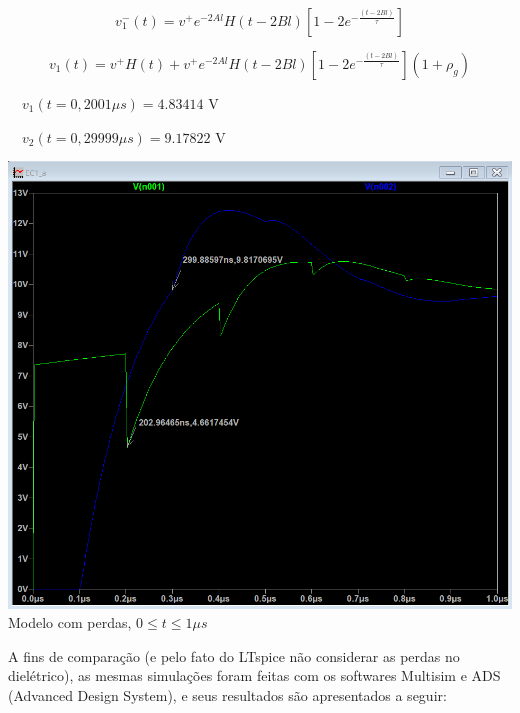 \documentclass[12pt,a4paper]{article}
\begin{document}
$$v_1^-(t) = v^+ e^{-2Al} H(t-2Bl)\left[ 1 - 2e^{-\frac{(t-2Bl)}{\tau}} \right]$$

$$v_1(t) = v^+ H(t) + v^+ e^{-2Al} H(t-2Bl)\left[ 1 - 2e^{-\frac{(t-2Bl)}{\tau}} \right](1 + \rho_g)$$

\ \ $v_1(t=0,2001\mu s) = 4.83414$ V

\ \ $v_2(t=0,29999\mu s) = 9.17822$ V

\begin{center}
    \includegraphics[scale=0.5]{Q1 item e.png}\\
    
    \small{Modelo com perdas, $0 \le t \le 1\mu s$}\\
\end{center}




A fins de comparação (e pelo fato do LTspice não considerar as perdas no dielétrico), as mesmas simulações foram feitas com os softwares Multisim e ADS (Advanced Design System), e seus resultados são apresentados a seguir:
\end{document}
